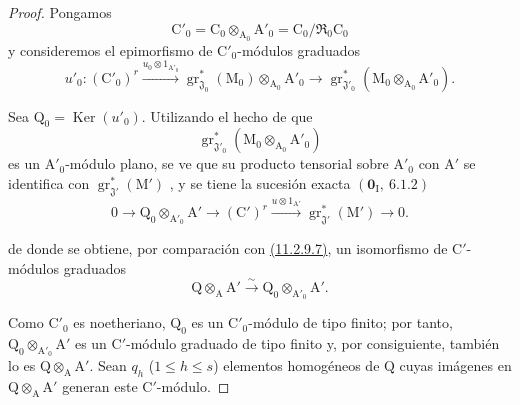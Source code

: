 \begin{proof}
Pongamos
\[
  \mathrm{C}'_0=\mathrm{C}_0\otimes_{\mathrm{A}_0}\mathrm{A}'_0
  =\mathrm{C}_0/\mathfrak{R}_0\mathrm{C}_0
\]
y consideremos el epimorfismo de $\mathrm{C}'_0$-módulos graduados
\[
  u'_0:(\mathrm{C}'_0)^r
  \xrightarrow{u_0\otimes 1_{\mathrm{A}'_0}}
  \operatorname{gr}^*_{\mathfrak{J}_0}(\mathrm{M}_0)\otimes_{\mathrm{A}_0}\mathrm{A}'_0
  \longrightarrow
  \operatorname{gr}^*_{\mathfrak{J}'_0}
  (\mathrm{M}_0\otimes_{\mathrm{A}_0}\mathrm{A}'_0).
\]

Sea $\mathrm{Q}_0=\operatorname{Ker}(u'_0)$. Utilizando el hecho de que
\[
  \operatorname{gr}^*_{\mathfrak{J}'_0}
  (\mathrm{M}_0\otimes_{\mathrm{A}_0}\mathrm{A}'_0)
\]
es un $\mathrm{A}'_0$-módulo plano, se ve que su producto tensorial sobre $\mathrm{A}'_0$ con $\mathrm{A}'$ se identifica con $\operatorname{gr}^*_{\mathfrak{J}'}(\mathrm{M}')$ , y se tiene la sucesión exacta $(\mathbf{0}_\mathrm{I},~6.1.2)$
\begin{equation}
  0\longrightarrow\mathrm{Q}_0\otimes_{\mathrm{A}'_0}\mathrm{A}'
  \longrightarrow(\mathrm{C}')^r
  \xrightarrow{u\otimes 1_{\mathrm{A}'}}
  \operatorname{gr}^*_{\mathfrak{J}'}(\mathrm{M}')
  \longrightarrow 0.
  \label{IV.11.2.9.8}
\tag{11.2.9.8}
\end{equation}


de donde se obtiene, por comparación con {\hyperlink{ega4.c04.thm.11-2-9}{(11.2.9.7)}}, un isomorfismo de $\mathrm{C}'$-módulos graduados
\[
  \mathrm{Q}\otimes_\mathrm{A}\mathrm{A}'
  \xrightarrow{\sim}
  \mathrm{Q}_0\otimes_{\mathrm{A}'_0}\mathrm{A}'.
\]

Como $\mathrm{C}'_0$ es noetheriano, $\mathrm{Q}_0$ es un $\mathrm{C}'_0$-módulo de tipo finito; por tanto, $\mathrm{Q}_0\otimes_{\mathrm{A}'_0}\mathrm{A}'$ es un $\mathrm{C}'$-módulo graduado de tipo finito y, por consiguiente, también lo es $\mathrm{Q}\otimes_\mathrm{A}\mathrm{A}'$. Sean $q_h$ ($1\leqslant h\leqslant s$) elementos homogéneos de $\mathrm{Q}$ cuyas imágenes en $\mathrm{Q}\otimes_\mathrm{A}\mathrm{A}'$ generan este $\mathrm{C}'$-módulo.


\end{proof}
